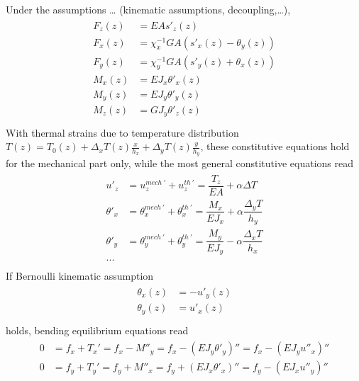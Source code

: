 \documentclass[letterpaper,10pt,english]{jupyterBook}
\begin{document}
\sphinxAtStartPar
{} Under the assumptions … (kinematic assumptions, decoupling,…),
\begin{equation*}
\begin{split}\begin{aligned}
  F_z(z) & = EA s'_z(z)  \\
  F_x(z) & = \chi^{-1}_x GA ( s'_x(z) -  \theta_y(z) )  \\
  F_y(z) & = \chi^{-1}_y GA ( s'_y(z) +  \theta_x(z) )  \\
  M_x(z) & = EJ_x \theta'_x(z)  \\
  M_y(z) & = EJ_y \theta'_y(z)  \\
  M_z(z) & = GJ_y \theta'_z(z)  \\
\end{aligned}\end{split}
\end{equation*}
\sphinxAtStartPar
With thermal strains due to temperature distribution \(T(z) = T_0(z) + \Delta_x T(z) \frac{x}{h_x} + \Delta_y T(z) \frac{y}{h_y}\), these constitutive equations hold for the mechanical part only, while the most general constitutive equations read
\begin{equation*}
\begin{split}\begin{aligned}
  u'_z      & = u^{mech \ '}_z + u^{th \ '}_z = \dfrac{T_z}{EA} + \alpha \Delta T \\
  \theta'_x & = \theta^{mech \ '}_x + \theta^{th \ '}_x = \dfrac{M_x}{EJ_x} + \alpha \dfrac{\Delta_y T}{h_y} \\
  \theta'_y & = \theta^{mech \ '}_y + \theta^{th \ '}_y = \dfrac{M_y}{EJ_y} - \alpha \dfrac{\Delta_x T}{h_x} \\
  ... \\
\end{aligned}\end{split}
\end{equation*}
\sphinxAtStartPar
{} If Bernoulli kinematic assumption
\begin{equation*}
\begin{split}\begin{aligned}
  \theta_x(z) & = - u'_y(z) \\
  \theta_y(z) & =   u'_x(z) \\
\end{aligned}\end{split}
\end{equation*}
\sphinxAtStartPar
holds, bending equilibrium equations read
\begin{equation*}
\begin{split}\begin{aligned}
 0 & = f_x + T_x' = f_x - M''_y = f_x - ( EJ_y \theta'_y )'' = f_x - ( EJ_y u''_x )'' \\
 0 & = f_y + T_y' = f_y + M''_x = f_y + ( EJ_x \theta'_x )'' = f_y - ( EJ_x u''_y )'' \\
\end{aligned}\end{split}
\end{equation*}
\end{document}
